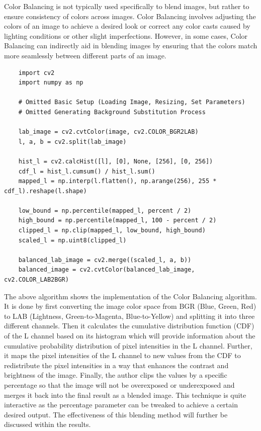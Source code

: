 \documentclass{article}
\begin{document}
Color Balancing is not typically used specifically to blend images, but rather to ensure consistency of colors across images. Color Balancing involves adjusting the colors of an image to achieve a desired look or correct any color casts caused by lighting conditions or other slight imperfections. However, in some cases, Color Balancing can indirectly aid in blending images by ensuring that the colors match more seamlessly between different parts of an image.

\begin{verbatim}
    import cv2
    import numpy as np

    # Omitted Basic Setup (Loading Image, Resizing, Set Parameters)
    # Omitted Generating Background Substitution Process
    
    lab_image = cv2.cvtColor(image, cv2.COLOR_BGR2LAB)
    l, a, b = cv2.split(lab_image)

    hist_l = cv2.calcHist([l], [0], None, [256], [0, 256])
    cdf_l = hist_l.cumsum() / hist_l.sum()
    mapped_l = np.interp(l.flatten(), np.arange(256), 255 * cdf_l).reshape(l.shape)

    low_bound = np.percentile(mapped_l, percent / 2)
    high_bound = np.percentile(mapped_l, 100 - percent / 2)
    clipped_l = np.clip(mapped_l, low_bound, high_bound)
    scaled_l = np.uint8(clipped_l)

    balanced_lab_image = cv2.merge((scaled_l, a, b))
    balanced_image = cv2.cvtColor(balanced_lab_image, cv2.COLOR_LAB2BGR)

\end{verbatim}

The above algorithm shows the implementation of the Color Balancing algorithm. It is done by first converting the image color space from BGR (Blue, Green, Red) to LAB (Lightness, Green-to-Magenta, Blue-to-Yellow) and splitting it into three different channels. Then it calculates the cumulative distribution function (CDF) of the L channel based on its histogram which will provide information about the cumulative probability distribution of pixel intensities in the L channel. Further, it maps the pixel intensities of the L channel to new values from the CDF to redistribute the pixel intensities in a way that enhances the contrast and brightness of the image. Finally, the author clips the values by a specific percentage so that the image will not be overexposed or underexposed and merges it back into the final result as a blended image. This technique is quite interactive as the percentage parameter can be tweaked to achieve a certain desired output. The effectiveness of this blending method will further be discussed within the results.
\end{document}
